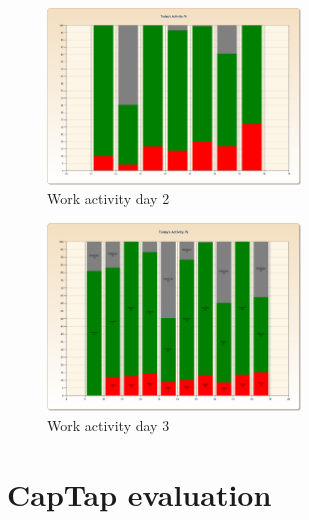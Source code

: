 \begin{figure}[ht]
\centering
\includegraphics[width=0.6\textwidth]{images/workact_day2}
\caption{Work activity day 2}
\label{fig:workact_day2}
\end{figure}

\begin{figure}[ht]
\centering
\includegraphics[width=0.6\textwidth]{images/workact_day3}
\caption{Work activity day 3}
\label{fig:workact_day3}
\end{figure}


\section{CapTap evaluation}
